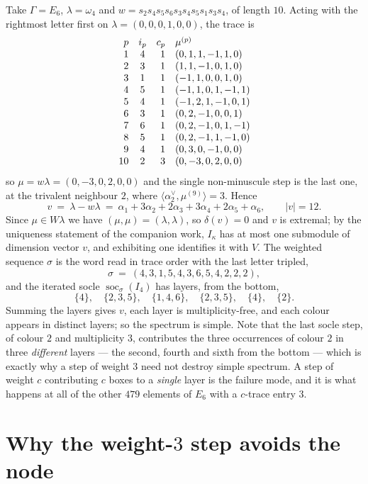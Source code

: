 \documentclass[reqno]{amsart}
\theoremstyle{plain}
\theoremstyle{definition}
\DeclareMathOperator{\soc}{soc}
\newcommand{\la}{\lambda}
\newcommand{\al}{\alpha}
\newcommand{\om}{\omega}
\newcommand{\ka}{\kappa}
\begin{document}
Take $\Gamma=E_6$, $\la=\om_4$ and
$w=s_2s_4s_5s_6s_3s_4s_5s_1s_3s_4$, of length $10$.  Acting with the rightmost
letter first on $\la=(0,0,0,1,0,0)$, the trace is
\[
\begin{array}{r@{\quad}c@{\quad}r@{\quad}l}
 p & i_p & c_p & \mu^{(p)} \\
 1 & 4 & 1 & (0,1,1,-1,1,0) \\
 2 & 3 & 1 & (1,1,-1,0,1,0) \\
 3 & 1 & 1 & (-1,1,0,0,1,0) \\
 4 & 5 & 1 & (-1,1,0,1,-1,1) \\
 5 & 4 & 1 & (-1,2,1,-1,0,1) \\
 6 & 3 & 1 & (0,2,-1,0,0,1) \\
 7 & 6 & 1 & (0,2,-1,0,1,-1) \\
 8 & 5 & 1 & (0,2,-1,1,-1,0) \\
 9 & 4 & 1 & (0,3,0,-1,0,0) \\
10 & 2 & 3 & (0,-3,0,2,0,0)
\end{array}
\]
so $\mu=w\la=(0,-3,0,2,0,0)$ and the single non-minuscule step is the last
one, at the trivalent neighbour $2$, where $\langle\al_2^\vee,\mu^{(9)}\rangle=3$.
Hence
\[
   v\ =\ \la-w\la\ =\ \al_1+3\al_2+2\al_3+3\al_4+2\al_5+\al_6,
   \qquad |v|=12 .
\]
Since $\mu\in W\la$ we have $(\mu,\mu)=(\la,\la)$, so $\delta(v)=0$ and $v$ is
extremal; by the uniqueness statement of the companion work, $I_\ka$ has at
most one submodule of dimension vector $v$, and exhibiting one identifies it
with $V$.  The weighted sequence $\sigma$ is the word read in trace order with
the last letter tripled,
\[
   \sigma\ =\ (4,3,1,5,4,3,6,5,4,2,2,2),
\]
and the iterated socle $\soc_\sigma(I_4)$ has layers, from the bottom,
\[
   \{4\},\quad \{2,3,5\},\quad \{1,4,6\},\quad \{2,3,5\},\quad \{4\},\quad \{2\} .
\]
Summing the layers gives $v$, each layer is multiplicity-free, and each colour
appears in distinct layers; so the spectrum is simple.  Note that the last
socle step, of colour $2$ and multiplicity $3$, contributes the three
occurrences of colour $2$ in three \emph{different} layers --- the second,
fourth and sixth from the bottom --- which is exactly why a step of weight $3$ need
not destroy simple spectrum.  A step of weight $c$ contributing $c$ boxes to a
\emph{single} layer is the failure mode, and it is what happens at all of the
other $479$ elements of $E_6$ with a $c$-trace entry $3$.

\section{Why the weight-$3$ step avoids the node}\label{sec:node}
\end{document}
